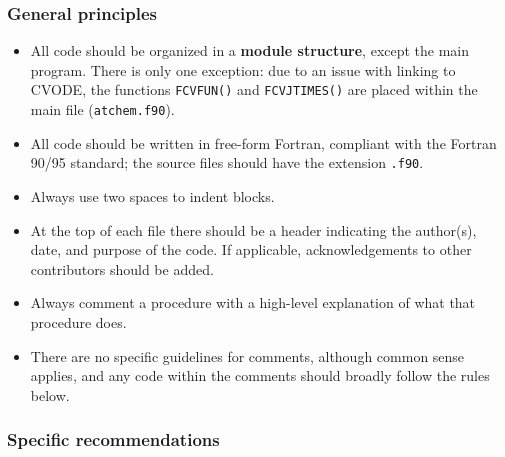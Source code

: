 \subsubsection{General principles}

\begin{itemize}
\item All code should be organized in a \textbf{module structure},
  except the main program. There is only one exception: due to an
  issue with linking to CVODE, the functions \texttt{FCVFUN()} and
  \texttt{FCVJTIMES()} are placed within the main file
  (\texttt{atchem.f90}).
\item All code should be written in free-form Fortran, compliant with
  the Fortran 90/95 standard; the source files should have the
  extension \texttt{.f90}.
\item Always use two spaces to indent blocks.
\item At the top of each file there should be a header indicating the
  author(s), date, and purpose of the code. If applicable,
  acknowledgements to other contributors should be added.
\item Always comment a procedure with a high-level explanation of what
  that procedure does.
\item There are no specific guidelines for comments, although common
  sense applies, and any code within the comments should broadly
  follow the rules below.
\end{itemize}

\subsubsection{Specific recommendations}

